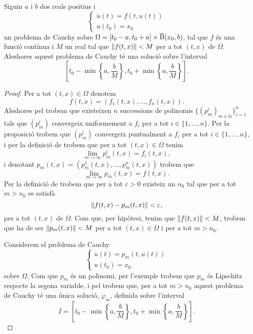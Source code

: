 \documentclass[../../Main.tex]{subfiles}
\begin{document}
	\begin{theorem}
		\label{thm:Teorema de Peano}
		Siguin \(a\) i \(b\) dos reals positius i
		\begin{equation}
			\label{thm:Teorema de Peano:eq3}
			\begin{cases}
				\displaystyle\dot{u}(t)=f(t,u(t)) \\
				\displaystyle u(t_{0})=x_{0}
			\end{cases}
		\end{equation}
		un problema de Cauchy sobre \(\Omega=[t_{0}-a,t_{0}+a]\times\overline{\operatorname{B}}(x_{0},b)\), tal que \(f\) és una funció contínua i \(M\) un real tal que \(\norm{f(t,x)}<M\) per a tot \((t,x)\) de \(\Omega\).
		Aleshores aquest problema de Cauchy té una solució sobre l'interval
		\[
		    \left[t_{0}-\min\left\{a,\frac{b}{M}\right\},t_{0}+\min\left\{a,\frac{b}{M}\right\}\right].
		\]
		\begin{proof} %
			Per a tot \((t,x)\in\Omega\) denotem
			\[
			    f(t,x)=(f_{1}(t,x),\dots,f_{n}(t,x)).
			\]
			Aleshores pel  trobem que existeixen \(n\) successions de polinomis \(\{(p_{m}^{i})_{m\in\mathbb{N}}\}_{i=1}^{n}\) tals que \((p_{m}^{i})\) convergeix uniformement a \(f_{i}\) per a tot \(i\in\{1,\dots,n\}\).
			Per la proposició  trobem que \((p_{m}^{i})\) convergeix puntualment a \(f_{i}\) per a tot \(i\in\{1,\dots,n\}\), i per la definició de  trobem que per a tot \((t,x)\in\Omega\) tenim
			\[
			    \lim_{m\to\infty}p_{m}^{i}(t,x)=f_{i}(t,x),
			\]
			i denotant \(p_{m}(t,x)=(p_{m}^{1}(t,x),\dots,p_{m}^{n}(t,x))\) trobem que
			\begin{equation}
				\label{thm:Teorema de Peano:eq2}
				\lim_{m\to\infty}p_{m}(t,x)=f(t,x).
			\end{equation}
			Per la definició de  trobem que per a tot \(\varepsilon>0\) existeix un \(n_{0}\) tal que per a tot \(m>n_{0}\) es satisfà
			\[
			    \norm{f(t,x)-p_{m}(t,x)}<\varepsilon,
			\]
			per a tot \((t,x)\) de \(\Omega\).
			Com que, per hipòtesi, tenim que \(\norm{f(t,x)}<M\), trobem que ha de ser \(\norm{p_{m}(t,x)}<M\) per a tot \((t,x)\in\Omega\) i per a tot \(m>n_{0}\).
			
			Considerem el problema de Cauchy
			\[\begin{cases}
				\displaystyle\dot{u}(t)=p_{m}(t,u(t)) \\
				\displaystyle u(t_{0})=x_{0}
			\end{cases}\] %
			sobre \(\Omega\).
			Com que \(p_{m}\) és un polinomi, per l'exemple  trobem que \(p_{m}\) és Lipschitz respecte la segona variable, i pel  trobem que, per a tot \(m>n_{0}\) aquest problema de Cauchy té una única solució, \(\varphi_{m}\), definida sobre l'interval
			\[
			    I=\left[t_{0}-\min\left\{a,\frac{b}{M}\right\},t_{0}+\min\left\{a,\frac{b}{M}\right\}\right].
			\]
			

\end{proof}
\end{theorem}
\end{document}
